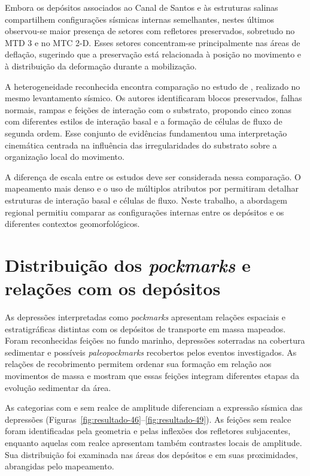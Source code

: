 Embora os depósitos associados ao Canal de Santos e às estruturas salinas compartilhem configurações sísmicas internas semelhantes, nestes últimos observou-se maior presença de setores com refletores preservados, sobretudo no MTD 3 e no MTC 2-D. Esses setores concentram-se principalmente nas áreas de deflação, sugerindo que a preservação está relacionada à posição no movimento e à distribuição da deformação durante a mobilização.

A heterogeneidade reconhecida encontra comparação no estudo de , realizado no mesmo levantamento sísmico. Os autores identificaram blocos preservados, falhas normais, rampas e feições de interação com o substrato, propondo cinco zonas com diferentes estilos de interação basal e a formação de células de fluxo de segunda ordem. Esse conjunto de evidências fundamentou uma interpretação cinemática centrada na influência das irregularidades do substrato sobre a organização local do movimento.

A diferença de escala entre os estudos deve ser considerada nessa comparação. O mapeamento mais denso e o uso de múltiplos atributos por  permitiram detalhar estruturas de interação basal e células de fluxo. Neste trabalho, a abordagem regional permitiu comparar as configurações internas entre os depósitos e os diferentes contextos geomorfológicos.

\section{Distribuição dos \textit{pockmarks} e relações com os depósitos}\label{sec:6-4}

As depressões interpretadas como \textit{pockmarks} apresentam relações espaciais e estratigráficas distintas com os depósitos de transporte em massa mapeados. Foram reconhecidas feições no fundo marinho, depressões soterradas na cobertura sedimentar e possíveis \textit{paleopockmarks }recobertos pelos eventos investigados. As relações de recobrimento permitem ordenar sua formação em relação aos movimentos de massa e mostram que essas feições integram diferentes etapas da evolução sedimentar da área.

As categorias com e sem realce de amplitude diferenciam a expressão sísmica das depressões (Figuras~\ref{fig:resultado-46}--\ref{fig:resultado-49}). As feições sem realce foram identificadas pela geometria e pelas inflexões dos refletores subjacentes, enquanto aquelas com realce apresentam também contrastes locais de amplitude. Sua distribuição foi examinada nas áreas dos depósitos e em suas proximidades, abrangidas pelo mapeamento.

